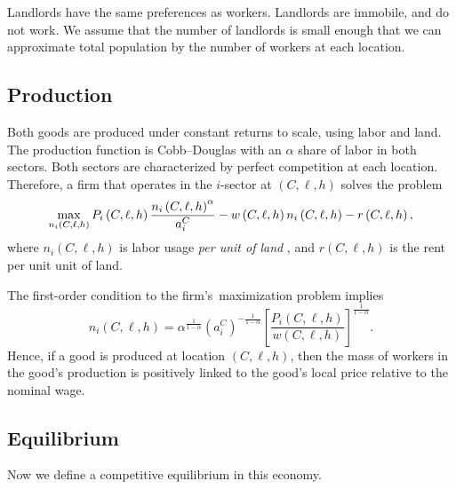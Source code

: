 \documentclass[12pt]{article}
\begin{document}
Landlords have the same preferences as workers. Landlords are immobile, and
do not work. We assume that the number of landlords is small enough that we
can approximate total population by the number of workers at each location.

\subsection{Production}

Both goods are produced under constant returns to scale, using labor and
land. The production function is Cobb--Douglas with an $\alpha $ share of
labor in both sectors. Both sectors are characterized by perfect competition
at each location. Therefore, a firm that operates in the $i$-sector at $%
\left( C,\ell ,h\right) $ solves the problem%
\begin{equation*}
\max_{n_{i}\left( C,\ell ,h\right) }P_{i}\left( C,\ell ,h\right) \frac{%
n_{i}\left( C,\ell ,h\right) ^{\alpha }}{a_{i}^{C}}-w\left( C,\ell ,h\right)
n_{i}\left( C,\ell ,h\right) -r\left( C,\ell ,h\right) ,
\end{equation*}%
where $n_{i}\left( C,\ell ,h\right) $ is labor usage \textit{per unit of land%
}, and $r\left( C,\ell ,h\right) $ is the rent per unit unit of land.

The first-order condition to the firm's\ maximization problem implies%
\begin{equation}
n_{i}\left( C,\ell ,h\right) =\alpha ^{\frac{1}{1-\alpha }}\left(
a_{i}^{C}\right) ^{-\frac{1}{1-\alpha }}\left[ \frac{P_{i}\left( C,\ell
,h\right) }{w\left( C,\ell ,h\right) }\right] ^{\frac{1}{1-\alpha }}.
\end{equation}%
Hence, if a good is produced at location $\left( C,\ell ,h\right) $, then
the mass of workers in the good's production is positively linked to the
good's local price relative to the nominal wage.

\subsection{Equilibrium}

Now we define a competitive equilibrium in this economy.
\end{document}

